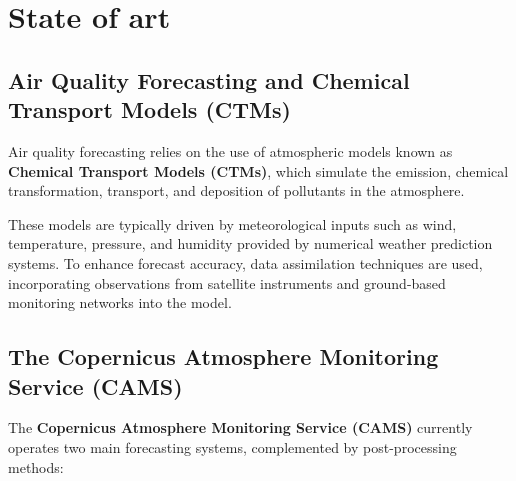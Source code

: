 \chapter[State of art]{State of art}
\label{Chap2}

\section{Air Quality Forecasting and Chemical Transport Models (CTMs)}

Air quality forecasting relies on the use of atmospheric models known as \textbf{Chemical Transport Models (CTMs)}, which simulate the emission, chemical transformation, transport, and deposition of pollutants in the atmosphere. 


These models are typically driven by meteorological inputs such as wind, temperature, pressure, and humidity provided by numerical weather prediction systems. To enhance forecast accuracy, data assimilation techniques are used, incorporating observations from satellite instruments and ground-based monitoring networks into the model.

\section{The Copernicus Atmosphere Monitoring Service (CAMS)}

The \textbf{Copernicus Atmosphere Monitoring Service (CAMS)} currently operates two main forecasting systems, complemented by post-processing methods:

